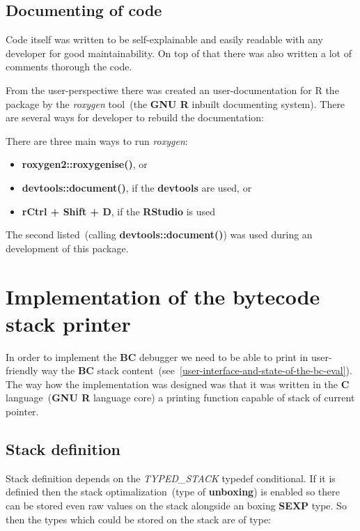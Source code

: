 \documentclass[thesis=M,english]{FITthesis}[2018/10/20]
\begin{document}
\subsection{Documenting of code}

Code itself was written to be self-explainable and easily readable with any developer for good maintainability. On top of that there was also written a lot of comments thorough the code.

From the user-perspectiwe there was created an user-documentation for R the package by the \textit{roxygen} tool~(the \textbf{GNU R} inbuilt documenting system). There are several ways for developer to rebuild the documentation:

There are three main ways to run \textit{roxygen}:
\begin{itemize}
 \item \textbf{roxygen2::roxygenise()}, or
 \item \textbf{devtools::document()}, if the \textbf{devtools} are used, or
 \item \textbf{rCtrl + Shift + D}, if the \textbf{RStudio} is used
\end{itemize}
 
The second listed~(calling \textbf{devtools::document()}) was used during an development of this package.

\section{Implementation of the bytecode stack printer}\label{implementation-of-stack-printer}

In order to implement the \textbf{BC} debugger we need to be able to print in user-friendly way the \textbf{BC} stack content~(see~\ref{user-interface-and-state-of-the-bc-eval}). The way how the implementation was designed was that it was written in the \textbf{C} language~(\textbf{GNU R} language core) a printing function capable of stack of current pointer.

\subsection{Stack definition}

Stack definition depends on the \textit{TYPED{\_}STACK} typedef conditional. If it is definied then the stack optimalization~(type of \textbf{unboxing}) is enabled so there can be stored even raw values on the stack alongside an boxing \textbf{SEXP} type. So then the types which could be stored on the stack are of type:
\end{document}
